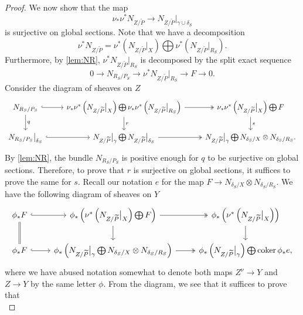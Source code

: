 \documentclass[11 pt]{amsart}
\providecommand{\coker}{\operatorname{coker}}
\numberwithin{equation}{section}
\begin{document}
\begin{proof}
  We now show that the map
  \begin{equation}\label{eq:tosurject}
   \nu_{*} \nu^* N_{Z/\widetilde{P}} \to N_{Z/\widetilde{P}}\big|_{\gamma \cup \delta_S}
  \end{equation}
  is surjective on global sections.
  Note that we have a decomposition
  \[ \nu^* N_{Z/\widetilde{P}} = \nu^* \left(N_{Z/\widetilde{P}}\big|_X\right) \bigoplus \nu^* \left(N_{Z/\widetilde{P}}\big|_{R_S}\right).\]
  Furthermore, by \autoref{lem:NR}, $\nu^* N_{Z/\widetilde{P}}|_{R_S}$ is decomposed by the split exact sequence
  \[ 0 \to N_{R_S/P_S} \to \nu^* N_{Z/\widetilde{P}}\big|_{R_S} \to F \to 0.\]
  Consider the diagram of sheaves on $Z$
  \[
    \begin{tikzcd}
      N_{R_S/P_S} \arrow[hookrightarrow]{r}\arrow{d}{q}& \nu_*\nu^* \left(N_{Z/\widetilde{P}}\big|_X\right) \bigoplus \nu_*\nu^*\left(N_{Z/\widetilde{P}}\big|_{R_S}\right) \arrow[two heads]{r}\arrow{d}{r}& \nu_*\nu^* \left(N_{Z/\widetilde{P}}\big|_X\right) \bigoplus F \arrow{d}{s}\\
      N_{R_S/P_S}\big|_{\delta_S} \arrow[hookrightarrow]{r}&       N_{Z/\widetilde{P}}\big|_\gamma \bigoplus N_{Z/\widetilde{P}}\big|_{\delta_S} \arrow[two heads]{r}&       N_{Z/\widetilde{P}}\big|_\gamma \bigoplus  N_{\delta_S/X} \otimes N_{\delta_S/R_S}.
    \end{tikzcd}
  \]
  By \autoref{lem:NR}, the bundle $N_{R_S/P_S}$ is positive enough for $q$ to be surjective on global sections.
  Therefore, to prove that $r$ is surjective on global sections, it suffices to prove the same for $s$.
  Recall our notation $e$ for the map $F \to N_{\delta_S/X} \otimes N_{\delta_S/R_S}$.
  We have the following diagram of sheaves on $Y$
  \[
    \begin{tikzcd}
      \phi_*F \arrow[hookrightarrow]{r}\arrow[equal]{d}& \phi_*\left(\nu^* \left(N_{Z/\widetilde{P}}\big|_X\right) \bigoplus F\right) \arrow[two heads]{r}\arrow{d}& \phi_*\left(\nu^* \left(N_{Z/\widetilde{P}}\big|_X\right)\right) \arrow{d} \\
      \phi_* F \arrow[hookrightarrow]{r}& \phi_*\left(N_{Z/\widetilde{P}}\big|_\gamma \bigoplus  N_{\delta_S/X} \otimes N_{\delta_S/R_S}\right) \arrow[two heads]{r}& \phi_*\left(N_{Z/\widetilde{P}}\big|_\gamma  \right) \bigoplus \coker \phi_* e,
    \end{tikzcd}
  \]
  where we have abused notation somewhat to denote both maps $Z^\nu \to Y$ and $Z \to Y$ by the same letter $\phi$.
  From the diagram, we see that it suffices to prove that 
  \begin{equation}\label{eq:tosurject3}

\end{equation}
\end{proof}
\end{document}
